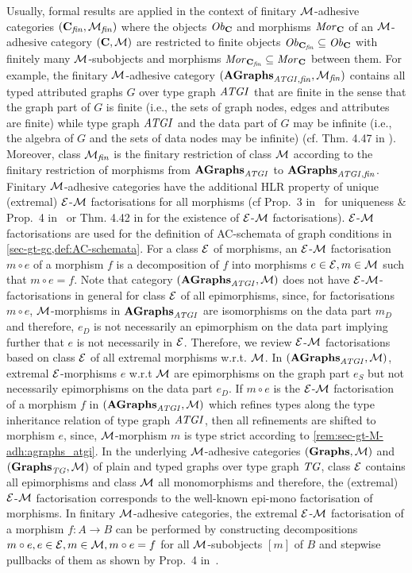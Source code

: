 Usually, formal results are applied in the context of finitary ${\cal M}$-adhesive categories $(\mathbf{C}_\mathit{fin},{\cal M}_\mathit{fin})$ where the objects $\mathit{Ob}_\mathbf{C}$ and morphisms $\mathit{Mor}_\mathbf{C}$ of an ${\cal M}$-adhesive category $(\mathbf{C},{\cal M})$ are restricted to finite objects $\mathit{Ob}_{\mathbf{C}_\mathit{fin}} \subseteq \mathit{Ob}_\mathbf{C}$ with finitely many ${\cal M}$-subobjects and morphisms $\mathit{Mor}_{\mathbf{C}_\mathit{fin}} \subseteq \mathit{Mor}_\mathbf{C}$ between them.
For example, the finitary ${\cal M}$-adhesive category $(\mathbf{AGraphs}_{\mathit{ATGI},\mathit{fin}},{\cal M}_\mathit{fin})$ contains all typed attributed graphs $G$ over type graph $\mathit{ATGI}$ that are finite in the sense that the graph part of $G$ is finite (i.e., the sets of graph nodes, edges and attributes are finite) while type graph $\mathit{ATGI}$ and the data part of $G$ may be infinite (i.e., the algebra of $G$ and the sets of data nodes may be infinite) (cf. Thm. 4.47 in \cite{FAGT2}).
Moreover, class ${\cal M}_\mathit{fin}$ is the finitary restriction of class ${\cal M}$ according to the finitary restriction of morphisms from $\mathbf{AGraphs}_\mathit{ATGI}$ to $\mathbf{AGraphs}_{\mathit{ATGI},\mathit{fin}}$.
Finitary ${\cal M}$-adhesive categories have the additional HLR property of unique (extremal) $\mathcal{E}$-${\cal M}$ factorisations for all morphisms (cf Prop.~3 in~\cite{BEGG10} for uniqueness \& Prop.~4 in~\cite{BEGG10} or Thm. 4.42 in \cite{FAGT2} for the existence of $\mathcal{E}$-${\cal M}$ factorisations).
$\mathcal{E}$-${\cal M}$ factorisations are used for the definition of AC-schemata of graph conditions in \cref{sec-gt-gc,def:AC-schemata}.
For a class $\mathcal{E}$ of morphisms, an $\mathcal{E}$-${\cal M}$ factorisation $m \circ e$ of a morphism $f$ is a decomposition of $f$ into morphisms $e \in \mathcal{E},m \in {\cal M}$ such that $m \circ e=f$.
Note that category $(\mathbf{AGraphs}_\mathit{ATGI},{\cal M})$ does not have $\mathcal{E}$-${\cal M}$-factorisations in general for class $\mathcal{E}$ of all epimorphisms, since, for factorisations $m \circ e$, ${\cal M}$-morphisms in $\mathbf{AGraphs}_\mathit{ATGI}$ are isomorphisms on the data part $m_D$ and therefore, $e_D$ is not necessarily an epimorphism on the data part implying further that $e$ is not necessarily in $\mathcal{E}$.
Therefore, we review $\mathcal{E}$-${\cal M}$ factorisations based on class $\mathcal{E}$ of all extremal morphisms w.r.t. ${\cal M}$.
In $(\mathbf{AGraphs}_\mathit{ATGI},{\cal M})$, extremal $\mathcal{E}$-morphisms $e$ w.r.t ${\cal M}$ are epimorphisms on the graph part $e_S$ but not necessarily epimorphisms on the data part $e_D$.
If $m \circ e$ is the $\mathcal{E}$-${\cal M}$ factorisation of a morphism $f$ in $(\mathbf{AGraphs}_\mathit{ATGI},{\cal M})$ which refines types along the type inheritance relation of type graph $\mathit{ATGI}$, then all refinements are shifted to morphism $e$, since, ${\cal M}$-morphism $m$ is type strict according to \cref{rem:sec-gt-M-adh:agraphs_atgi}.
In the underlying ${\cal M}$-adhesive categories $(\mathbf{Graphs},{\cal M})$ and $(\mathbf{Graphs}_\mathit{TG},{\cal M})$ of plain and typed graphs over type graph $\mathit{TG}$, class $\mathcal{E}$ contains all epimorphisms and class ${\cal M}$ all monomorphisms and therefore, the (extremal) $\mathcal{E}$-${\cal M}$ factorisation corresponds to the well-known epi-mono factorisation of morphisms.
In finitary ${\cal M}$-adhesive categories, the extremal $\mathcal{E}$-${\cal M}$ factorisation of a morphism $f\colon A \to B$ can be performed by constructing decompositions $m \circ e, e \in \mathcal{E},m\in {\cal M},m\circ e=f$ for all ${\cal M}$-subobjects $[m]$ of $B$ and stepwise pullbacks of them as shown by Prop.~4 in~\cite{BEGG10}.

